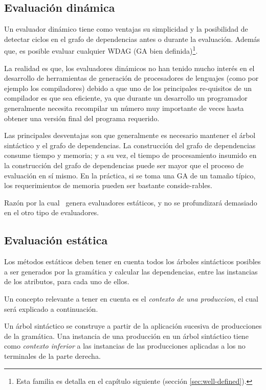\subsection{Evaluación dinámica}

Un evaluador dinámico tiene como ventajas su simplicidad y la posibilidad de detectar ciclos en el grafo de dependencias antes o durante la evaluación. Además que, es posible evaluar cualquier WDAG (GA bien definida)\footnote{Esta familia es detalla en el capítulo siguiente (sección \ref{sec:well-defined}).}.

La realidad es que, los evaluadores dinámicos no han tenido mucho interés en el desarrollo de herramientas de generación de procesadores de lenguajes (como por ejemplo los compiladores) debido a que uno de los principales re-quisitos de un compilador es que sea eficiente, ya que durante un desarrollo un programador generalmente necesita recompilar un número muy importante de veces hasta obtener una versión final del programa requerido.

Las principales desventajas son que generalmente es necesario mantener el árbol sintáctico y el grafo de dependencias. La construcción del grafo de dependencias consume tiempo y memoria; y a su vez, el tiempo de procesamiento insumido en la construcción del grafo de dependencias puede ser mayor que el proceso de evaluación en sí mismo. En la práctica, si se toma una GA de un tamaño típico, los requerimientos de memoria pueden ser bastante conside-rables.  

Razón por la cual \maggen\ genera evaluadores estáticos, y no se profundizará demasiado en el otro tipo de evaluadores.

\subsection{Evaluación estática}
\label{subsec:eval-est}
Los métodos estáticos deben tener en cuenta todos los árboles sintácticos posibles a ser generados por la gramática y calcular las dependencias, entre las instancias de los atributos, para cada uno de ellos. 

Un concepto relevante a tener en cuenta es el \textit{contexto de una produccion}, el cual será explicado a continuación.

Un árbol sintáctico se construye a partir de la aplicación sucesiva de producciones de la gramática. Una instancia de una producción en un árbol sintáctico tiene como \emph{contexto inferior} a las instancias de las producciones aplicadas a los no terminales de la parte derecha.

